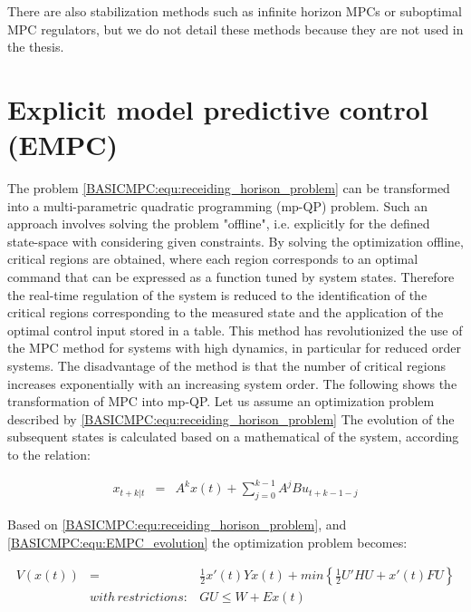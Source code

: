 There are also stabilization methods such as infinite horizon MPCs or suboptimal MPC regulators, but we do not detail these methods because they are not used in the thesis.

\section{Explicit model predictive control (EMPC)}

The problem \ref{BASICMPC:equ:receiding_horison_problem} can be transformed into a multi-parametric quadratic programming (mp-QP) problem. Such an approach involves solving the problem "offline", i.e. explicitly for the defined state-space with considering given constraints. By solving the optimization offline, critical regions are obtained, where each region corresponds to an optimal command that can be expressed as a function tuned by system states. Therefore the real-time regulation of the system is reduced to the identification of the critical regions corresponding to the measured state and the application of the optimal control input stored in a table. This method has revolutionized the use of the MPC method for systems with high dynamics, in particular for reduced order systems. The disadvantage of the method is that the number of critical regions increases exponentially with an increasing system order. The following shows the transformation of MPC into
mp-QP.
Let us assume an optimization problem described by \ref{BASICMPC:equ:receiding_horison_problem} The evolution of the subsequent states is calculated based on a mathematical of the system, according to the relation:

\begin{equation}
        \begin{array}{rcl}
				x_{t+k|t}&=&A^kx(t)+\sum^{k-1}_{j=0}A^jBu_{t+k-1-j}
        \end{array}
        \label{BASICMPC:equ:EMPC_evolution}
    \end{equation}

Based on \ref{BASICMPC:equ:receiding_horison_problem}, and \ref{BASICMPC:equ:EMPC_evolution} the optimization problem becomes:

\begin{equation}
        \begin{array}{rcl}
				V(x(t))&=&\frac{1}{2}x'(t)Yx(t)+min\left\{\frac{1}{2}U'HU+x'(t)FU\right\}\\
				&with\,restrictions:&GU\leq W+Ex(t)\\
        \end{array}
        \label{BASICMPC:equ:EMPC_transformed}
    \end{equation}
		
